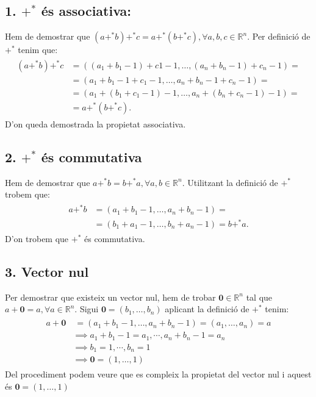 \documentclass[a4paper, 9pt]{article}
\begin{document}
    \subsection*{1. ${+^*}$ \'es associativa:}
        Hem de demostrar que ${(a+^*b)+^*c = a+^*(b+^*c), \forall a,b,c \in \mathbb{R}^n}$. Per definici\'o de ${+^*}$ tenim que:
        \begin{align*}
            \begin{aligned}
                (a+^*b)+^*c &= ((a_1+b_1-1)+c1-1,\dots,(a_n+b_n-1)+c_n-1) =\\ 
                        &= (a_1+b_1-1+c_1-1,\dots,a_n+b_n-1+c_n-1) =\\ 
                        &= (a_1+(b_1+c_1-1)-1,\dots,a_n+(b_n+c_n-1)-1) =\\
                        &= a+^*(b+^*c).
            \end{aligned}
        \end{align*}
        D'on queda demostrada la propietat associativa.

    \subsection*{2. ${+^*}$ \'es commutativa}
        Hem de demostrar que ${a +^* b = b +^* a, \forall a,b \in \mathbb{R}^n}$. Utilitzant la definici\'o de ${+^*}$ trobem que:
        \begin{align*}
            \begin{aligned}
                a +^* b &= (a_1 + b_1 -1, \dots , a_n+b_n-1) =\\
                        &=(b_1+a_1-1, \dots , b_n+a_n-1) = b +^* a.
            \end{aligned}
        \end{align*}
        D'on trobem que ${+^*}$ \'es commutativa.

    \subsection*{3. Vector nul} 
        Per demostrar que existeix un vector nul, hem de trobar ${\mathbf{0} \in \mathbb{R}^n}$ tal que ${a + \mathbf{0} = a, \forall a \in \mathbb{R}^n}$. Sigui ${\mathbf{0} = (b_1,\dots,b_n)}$ aplicant la definici\'o de ${+^*}$ tenim:
        \begin{align*}
            \begin{aligned}
                a + \mathbf{0} &\:= (a_1+b_1-1,\dots,a_n+b_n-1) = (a_1,\dots,a_n) = a \\
                            &\implies  a_1+b_1-1 = a_1, \cdots, a_n+b_n-1 = a_n \\
                            &\implies b_1 = 1, \cdots , b_n = 1\\
                            &\implies \mathbf{0} = (1, \dots, 1)
            \end{aligned}
        \end{align*}
        Del procediment podem veure que es compleix la propietat del vector nul i aquest \'es ${\mathbf{0} = (1,\dots,1)}$
        
\end{document}
